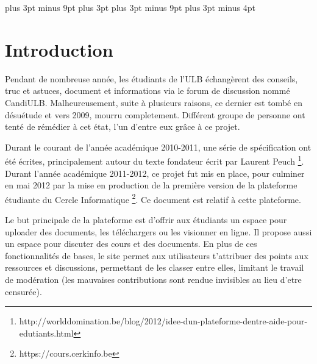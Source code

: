 \documentclass[a4paper,12pt]{article}
\begin{document}
\setlength{\footskip}{40pt}

\abovedisplayskip=9pt plus 3pt minus 9pt
\abovedisplayshortskip=6pt plus 3pt
\belowdisplayskip=9pt plus 3pt minus 9pt
\belowdisplayshortskip=9pt plus 3pt minus 4pt
\setlength{\parskip}{0.5ex plus 0.2ex minus 0.2ex}
\setlength{\parindent}{0pt}

\newpage
\setlength{\voffset}{0pt}
\setcounter{tocdepth}{2}
\tableofcontents

\newpage

\section{Introduction}

Pendant de nombreuse année, les étudiants de l'ULB échangèrent des conseils, truc et astuces,
document et informations via le forum de discussion nommé CandiULB. Malheureusement, suite
à plusieurs raisons, ce dernier est tombé en désuétude et vers 2009, mourru completement.
Différent groupe de personne ont tenté de rémédier à cet état, l'un d'entre eux grâce à ce projet.

Durant le courant de l'année académique 2010-2011, une série de spécification ont été écrites,
principalement autour du texte fondateur écrit par Laurent Peuch
\footnote{http://worlddomination.be/blog/2012/idee-dun-plateforme-dentre-aide-pour-edutiants.html}.
Durant l'année académique 2011-2012, ce projet fut mis en place, pour culminer en mai 2012
par la mise en production de la première version de la plateforme étudiante du Cercle Informatique
\footnote{https://cours.cerkinfo.be}. Ce document est relatif à cette plateforme.

Le but principale de la plateforme est d'offrir aux étudiants un espace pour uploader
des documents, les téléchargers ou les visionner en ligne. Il propose aussi un espace
pour discuter des cours et des documents. En plus de ces fonctionnalités de bases,
le site permet aux utilisateurs t'attribuer des points aux ressources et discussions,
permettant de les classer entre elles, limitant le travail de modération (les mauvaises
contributions sont rendue invisibles au lieu d'etre censurée).
\end{document}
